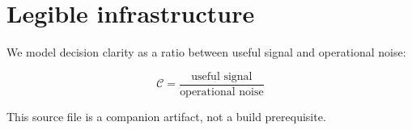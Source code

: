 \section*{Legible infrastructure}

We model decision clarity as a ratio between useful signal and operational noise:

\[
  \mathcal{C} = \frac{\text{useful signal}}{\text{operational noise}}
\]

This source file is a companion artifact, not a build prerequisite.
